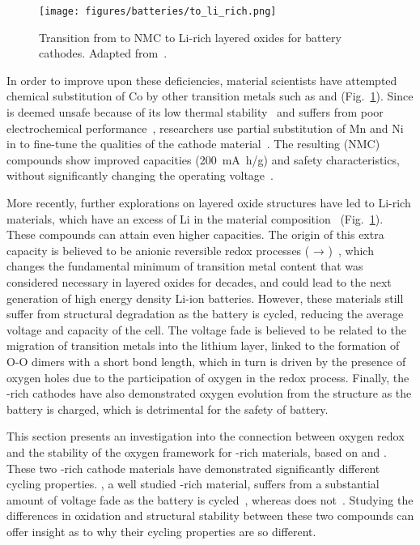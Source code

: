 \begin{refsection}
\begin{figure}[ht] 
\centering 
\captionsetup{width=0.9\linewidth}
\texttt{[image: figures/batteries/to\_li\_rich.png]} 
\caption{Transition from  to \gls{NMC} to Li-rich layered oxides for 
battery cathodes. Adapted from~\cite{Rozier2015}.} 
\label{batteries:fig-Lirich_transition} 
\end{figure} 
 
In order to improve upon these deficiencies, material scientists have 
attempted chemical substitution of Co by other transition metals such as 
 and  (Fig.~\ref{batteries:fig-Lirich_transition}). Since 
 is deemed unsafe because of its low thermal 
stability~\cite{Ohzuku1993} and  suffers from poor electrochemical 
performance~\cite{Vitins1997}, researchers use partial substitution of Mn and 
Ni in  to fine-tune the qualities of the cathode 
material~\cite{Koyama2003}. The resulting  (NMC) 
compounds show improved capacities (200~\si{\milli\ampere\hour/\gram}) and 
safety characteristics, without significantly changing the operating 
voltage~\cite{Zhou2011}.  
 
More recently, further explorations on layered oxide structures have led to 
Li-rich materials, which have an excess of Li in the material 
composition~\cite{Thackeray2007} (Fig.~\ref{batteries:fig-Lirich_transition}). 
These compounds can attain even higher capacities. The origin of this extra 
capacity is believed to be anionic reversible redox processes ( → 
)~\cite{Sathiya2013}, which changes the fundamental minimum of 
transition metal content that was considered necessary in layered oxides for 
decades, and could lead to the next generation of high energy density Li-ion 
batteries. However, these materials still suffer from structural degradation 
as the battery is cycled, reducing the average voltage and capacity of the 
cell. The voltage fade is believed to be related to the migration of 
transition metals into the lithium layer, linked to the formation of O-O 
dimers with a short bond length, which in turn is driven by the presence of 
oxygen holes due to the participation of oxygen in the redox process. Finally, 
the -rich cathodes have also demonstrated oxygen evolution from the 
structure as the battery is charged, which is detrimental for the safety of 
battery. 
 
This section presents an investigation into the connection between oxygen 
redox and the stability of the oxygen framework for -rich materials, 
based on  and . These two -rich cathode 
materials have demonstrated significantly different cycling properties. 
, a well studied -rich material, suffers from a substantial 
amount of voltage fade as the battery is cycled~\cite{Croy2014}, whereas 
 does not~\cite{McCalla2015}. Studying the differences in 
oxidation and structural stability between these two compounds can offer 
insight as to why their cycling properties are so different.  
 

\end{refsection}
